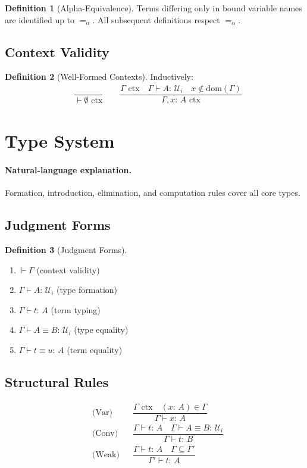 \documentclass[12pt]{article}
\newcommand{\Entails}{\vdash}
\newcommand{\Types}{:\,}
\newcommand{\Ctx}{\Gamma}
\newcommand{\UU}[1]{\mathcal{U}_{#1}}
\theoremstyle{definition}
\newtheorem{definition}{Definition}
\begin{document}
\begin{definition}[Alpha-Equivalence]
Terms differing only in bound variable names are identified up to $=_\alpha$.
All subsequent definitions respect $=_\alpha$.
\end{definition}

\subsection{Context Validity}
\begin{definition}[Well-Formed Contexts]
Inductively:
\begin{align*}
&\dfrac{}{\Entails \emptyset \text{ ctx}} \qquad
\dfrac{\Ctx \text{ ctx} \quad \Ctx \Entails A \Types \UU{i} \quad x \notin \text{dom}(\Ctx)}
      {\Ctx, x \Types A \text{ ctx}}
\end{align*}
\end{definition}

\section{Type System}
\paragraph{Natural-language explanation.} Formation, introduction, elimination, and computation rules cover all core types.

\subsection{Judgment Forms}
\begin{definition}[Judgment Forms]
\begin{enumerate}
\item $\Entails \Ctx$ (context validity)
\item $\Ctx \Entails A \Types \UU{i}$ (type formation)
\item $\Ctx \Entails t \Types A$ (term typing)
\item $\Ctx \Entails A \equiv B \Types \UU{i}$ (type equality)
\item $\Ctx \Entails t \equiv u \Types A$ (term equality)
\end{enumerate}
\end{definition}

\subsection{Structural Rules}
\begin{align*}
&\text{(Var)} && \dfrac{\Ctx \text{ ctx} \quad (x \Types A) \in \Ctx}
                       {\Ctx \Entails x \Types A} \\
&\text{(Conv)} && \dfrac{\Ctx \Entails t \Types A \quad \Ctx \Entails A \equiv B \Types \UU{i}}
                        {\Ctx \Entails t \Types B} \\
&\text{(Weak)} && \dfrac{\Ctx \Entails t \Types A \quad \Ctx \subseteq \Ctx'}
                        {\Ctx' \Entails t \Types A}
\end{align*}
\end{document}
